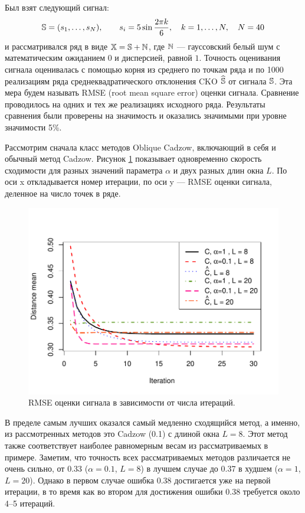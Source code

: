 \documentclass[12pt,a4paper,fleqn,leqno]{article}
\begin{document}
Был взят следующий сигнал:
\begin{equation*}
\mathbb{S} = (s_{1}, \ldots, s_N), \qquad s_{i} = 5\sin{\frac{2 \pi k}{6}}, \quad k = 1, \ldots, N, \quad N = 40
\end{equation*}
и рассматривался ряд в виде $\mathbb{X} = \mathbb{S} + \mathbb{N}$, где  $\mathbb{N}$ --- гауссовский белый шум с математическим ожиданием $0$ и дисперсией, равной $1$.
Точность оценивания сигнала оценивалась с помощью корня из среднего по точкам ряда и по 1000 реализациям ряда среднеквадратического отклонения CKO 
$\widehat{\mathbb{S}}$ от сигнала $\mathbb{S}$.
Эта мера будем называть RMSE (root mean square error) оценки сигнала.
Сравнение проводилось на одних и тех же реализациях исходного ряда. Результаты сравнения были проверены на значимость и оказались значимыми
при уровне значимости 5\%. %

Рассмотрим сначала класс методов Oblique Cadzow, включающий в себя и обычный метод Cadzow.
Рисунок \ref{img_cadzowspeed2} показывает одновременно скорость сходимости для разных значений параметра $\alpha$ и двух разных длин окна $L$.
По оси x откладывается номер итерации, по оси y --- RMSE оценки сигнала, деленное на число точек в ряде.
\begin{figure}[!hhh]
\begin{center}
\includegraphics[width = 15cm]{cadzowspeed_2.pdf}
\caption{RMSE оценки сигнала в зависимости от числа итераций.}
\label{img_cadzowspeed2}
\end{center}
\end{figure}

В пределе самым лучших оказался самый медленно сходящийся метод, а именно, из рассмотренных методов это Cadzow (0.1) с длиной окна $L=8$.
Этот метод также соответствует наиболее равномерным весам из рассматриваемых в примере.
Заметим, что точность всех рассматриваемых методов различается не очень сильно, от 0.33 ($\alpha=0.1$, $L=8$) в лучшем случае до 0.37 в худшем
($\alpha=1$, $L=20$). Однако в первом случае ошибка 0.38 достигается уже на первой итерации, в то время как во втором для
достижения ошибки 0.38 требуется около 4--5 итераций. 
\end{document}
